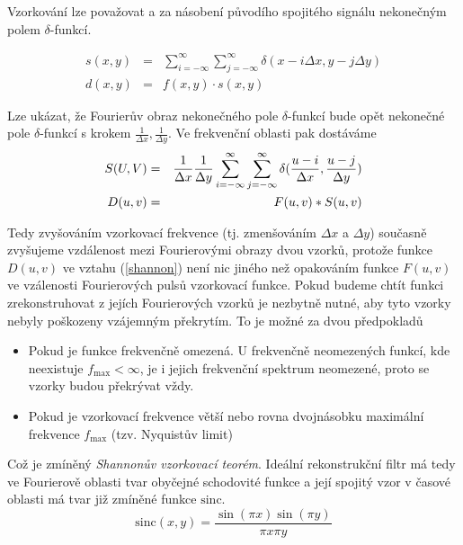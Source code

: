 Vzorkování lze považovat a za násobení původího spojitého signálu nekonečným polem $\delta$-funkcí.

\begin{eqnarray}
s(x,y)&=&\sum\limits_{i=-\infty}^\infty\sum\limits_{j=-\infty}^\infty\delta(x-i\Delta x,y-j\Delta y)\\
d(x,y)&=&f(x,y)\cdot s(x,y)
\end{eqnarray}

Lze ukázat, že Fourierův obraz nekonečného pole $\delta$-funkcí bude opět nekonečné pole $\delta$-funkcí s krokem
$\frac{1}{\Delta x},\frac{1}{\Delta y}$. Ve frekvenční oblasti pak dostáváme
\begin{eqnarray}
S(U,V)&=&\frac{1}{\Delta x}\frac{1}{\Delta y}\sum\limits_{i=-\infty}^\infty\sum\limits_{j=-\infty}^\infty
\delta(\frac{u-i}{\Delta x},\frac{u-j}{\Delta y})\\
D(u,v)&=&F(u,v)\ast S(u,v)\label{shannon}
\end{eqnarray}

Tedy zvyšováním vzorkovací frekvence (tj. zmenšováním $\Delta x$ a $\Delta y$) současně zvyšujeme vzdálenost mezi
Fourierovými obrazy dvou vzorků, protože funkce $D(u,v)$ ve vztahu (\ref{shannon}) není nic jiného než opakováním
funkce $F(u,v)$ ve vzálenosti Fourierových pulsů vzorkovací funkce. Pokud budeme chtít funkci zrekonstruhovat
z jejích Fourierových vzorků je nezbytně nutné, aby tyto vzorky nebyly poškozeny vzájemným překrytím. To je možné za 
dvou předpokladů

\begin{itemize}
\item Pokud je funkce frekvenčně omezená. U frekvenčně neomezených funkcí, kde neexistuje $f_{\max}<\infty$, je i jejich
frekvenční spektrum neomezené, proto se vzorky budou překrývat vždy.
\item Pokud je vzorkovací frekvence větší nebo rovna dvojnásobku maximální frekvence $f_{\max}$ (tzv. Nyquistův limit)
\end{itemize}

 
Což je zmíněný {\em Shannonův vzorkovací teorém}. Ideální rekonstrukční filtr má tedy ve Fourierově oblasti tvar obyčejné
schodovité funkce a její spojitý vzor v časové oblasti  má tvar již zmíněné funkce $\mathrm{sinc}$.
\begin{equation}
\mathrm{sinc}(x,y)=\frac{\sin(\pi x)\sin(\pi y)}{\pi x \pi y}
\end{equation}

